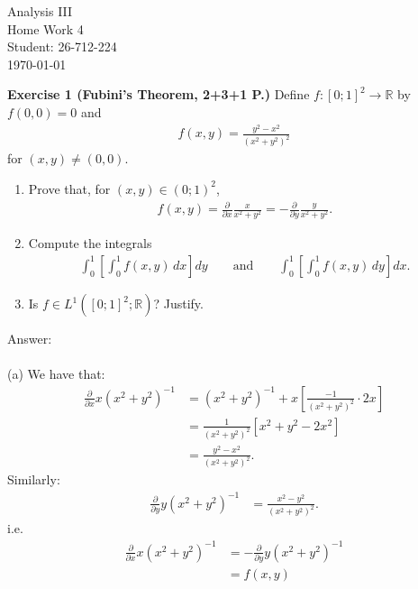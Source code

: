 \documentclass[12pt,a4paper]{article}
\begin{document}
\begin{titlepage}
\centering
\vspace*{\fill}
{\Huge Analysis III} \\[0.5cm]
{\Huge Home Work 4}\\[1.5cm]
{\Large Student: 26-712-224}\\[0.5cm]
{\Large \today}
\vspace*{\fill}
\end{titlepage}

\newpage
\textbf{Exercise 1 (Fubini's Theorem, 2+3+1 P.)}
Define $f:[0;1]^2\to\mathbb{R}$ by $f(0,0)=0$ and
\begin{align*}
f(x,y)=\frac{y^2-x^2}{(x^2+y^2)^2}
\end{align*}
for $(x,y)\neq(0,0)$.
\begin{enumerate}
\item[(a)] Prove that, for $(x,y)\in(0;1)^2$,
\begin{align*}
f(x,y)=\frac{\partial}{\partial x}\frac{x}{x^2+y^2}
=-\frac{\partial}{\partial y}\frac{y}{x^2+y^2}.
\end{align*}
\item[(b)] Compute the integrals
\begin{align*}
\int_0^1\left[\int_0^1 f(x,y)\,dx\right]dy
\qquad\text{and}\qquad
\int_0^1\left[\int_0^1 f(x,y)\,dy\right]dx.
\end{align*}
\item[(c)] Is $f\in L^1([0;1]^2;\mathbb{R})$? Justify.
\end{enumerate}

\vspace{1cm}
\noindent
Answer:\\
\\
(a) We have that:
\begin{align*}
\frac{\partial}{\partial x}x(x^2+y^2)^{-1}
&=(x^2+y^2)^{-1}
+x\left[\frac{-1}{(x^2+y^2)^2}\cdot2x\right]\\
&=\frac{1}{(x^2+y^2)^2}\left[x^2+y^2-2x^2\right]\\
&=\frac{y^2-x^2}{(x^2+y^2)^2}.
\end{align*}
Similarly:
\begin{align*}
\frac{\partial}{\partial y}y(x^2+y^2)^{-1}
&=\frac{x^2-y^2}{(x^2+y^2)^2}.
\end{align*}
i.e.
\begin{align*}
\frac{\partial}{\partial x}x(x^2+y^2)^{-1}
&=-\frac{\partial}{\partial y}y(x^2+y^2)^{-1} \\
&= f(x,y)
\end{align*}
\end{document}
